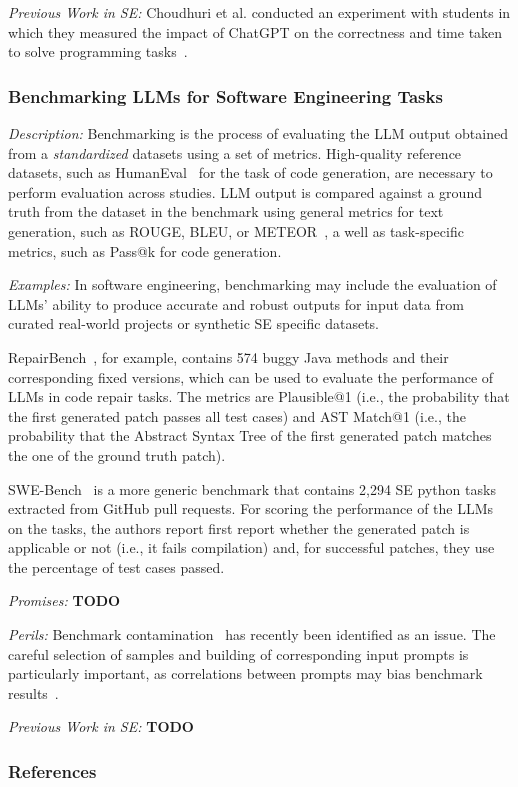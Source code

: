 \documentclass[11pt]{article}
\begin{document}
\emph{Previous Work in SE:}  Choudhuri et al. conducted an experiment with students in which they measured the impact of ChatGPT on the correctness and time taken to solve programming tasks~\cite{DBLP:conf/icse/ChoudhuriLSGS24}.


\subsubsection{Benchmarking LLMs for Software Engineering Tasks}

\emph{Description:} Benchmarking is the process of evaluating the LLM output obtained from a \textit{standardized} datasets using a set of  metrics.
High-quality reference datasets, such as HumanEval~\cite{DBLP:journals/corr/abs-2107-03374} for the task of code generation, are necessary to perform evaluation across studies.
LLM output is compared against a ground truth from the dataset in the benchmark using general metrics for text generation, such as ROUGE, BLEU, or METEOR~\cite{10.1145/3695988}, a well as task-specific metrics, such as Pass@k for code generation.

\emph{Examples:} In software engineering, benchmarking may include the evaluation of LLMs' ability to produce accurate and robust outputs for input data from curated real-world projects or synthetic SE specific datasets.

RepairBench~\cite{silva2024repairbench}, for example, contains 574 buggy Java methods and their corresponding fixed versions, which can be used to evaluate the performance of LLMs in code repair tasks.
The metrics are Plausible@1 (i.e., the probability that the first generated patch passes all test cases) and AST Match@1 (i.e., the probability that the Abstract Syntax Tree of the first generated patch matches the one of the ground truth patch).

SWE-Bench~\cite{DBLP:conf/iclr/JimenezYWYPPN24} is a more generic benchmark that contains 2,294 SE python tasks extracted from GitHub pull requests.
For scoring the performance of the LLMs on the tasks, the authors report first report whether the generated patch is applicable or not (i.e., it fails compilation) and, for successful patches, they use the percentage of test cases passed.

\emph{Promises:} \textbf{TODO}

\emph{Perils:} Benchmark contamination~\cite{DBLP:journals/corr/abs-2410-16186} has recently been identified as an issue.
The careful selection of samples and building of corresponding input prompts is particularly important, as correlations between prompts may bias benchmark results~\cite{DBLP:conf/acl/SiskaMAB24}.

\emph{Previous Work in SE:} \textbf{TODO}

\subsubsection{References}



\end{document}
